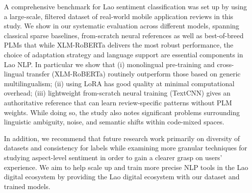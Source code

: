 \documentclass[conference, onecolumn]{IEEEtran}
\begin{document}

A comprehensive benchmark for Lao sentiment classification was set up by using a large-scale, filtered dataset of real-world mobile application reviews in this study. We show in our systematic evaluation across different models, spanning classical sparse baselines, from-scratch neural references as well as best-of-breed PLMs that while XLM-RoBERTa delivers the most robust performance, the choice of adaptation strategy and language support are essential components in Lao NLP. In particular we show that (i) monolingual pre-training and cross-lingual transfer (XLM-RoBERTa) routinely outperform those based on generic multilingualism; (ii) using LoRA has good quality at minimal computational overhead; (iii) lightweight from-scratch neural training (TextCNN) gives an authoritative reference that can learn review-specific patterns without PLM weights. While doing so, the study also notes significant problems surrounding linguistic ambiguity, noise, and semantic shifts within code-mixed spaces.
 
In addition, we recommend that future research work primarily on diversity of datasets and consistency for labels while examining more granular techniques for studying aspect-level sentiment in order to gain a clearer grasp on users' experience. We aim to help scale up and train more precise NLP tools in the Lao digital ecosystem by providing the Lao digital ecosystem with our dataset and trained models.


\end{document}
